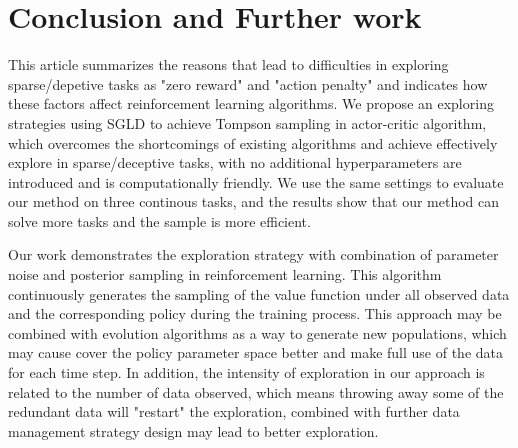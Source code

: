 \section{Conclusion and Further work}
This article summarizes the reasons that lead to difficulties in exploring sparse/depetive tasks as "zero reward" and "action penalty" and indicates how these factors affect reinforcement learning algorithms. We propose an exploring strategies using SGLD to achieve Tompson sampling in actor-critic algorithm, which overcomes the shortcomings of existing algorithms and achieve effectively explore in sparse/deceptive tasks, with no additional hyperparameters are introduced and is computationally friendly. We use the same settings to evaluate our method on three continous tasks, and the results show that our method can solve more tasks and the sample is more efficient.

Our work demonstrates the exploration strategy with combination of parameter noise and posterior sampling in reinforcement learning. This algorithm continuously generates the sampling of the value function under all observed data and the corresponding policy during the training process. This approach may be combined with evolution algorithms as a way to generate new populations, which may cause cover the policy parameter space better and make full use of the data for each time step. In addition, the intensity of exploration in our approach is related to the number of data observed, which means throwing away some of the redundant data will "restart" the exploration, combined with further data management strategy design may lead to better exploration.